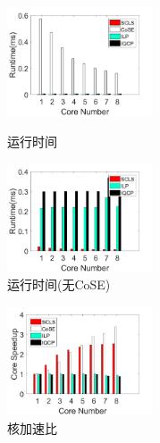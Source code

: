 \begin{frame}
\begin{figure}[htbp]
\centering
\begin{minipage}[t]{0.3\linewidth}
\centering
\includegraphics[width=1.7in]{figures/runtime}
\caption{运行时间}
\label{fig:normalization runtime}
\end{minipage}
\hfill
\begin{minipage}[t]{0.3\linewidth}
\centering
\includegraphics[width=1.7in]{figures/Runtime_noKSP_noCOSE}\\
  \caption{运行时间(无CoSE)}\label{fig:Runtime_noKSP_noCOSE}
\end{minipage}
\hfill
\begin{minipage}[t]{0.3\linewidth}
\centering
\includegraphics[width=1.7in]{figures/speedup}
\caption{核加速比}
\label{fig:Speedup}
\end{minipage}
\end{figure}
\end{frame}

